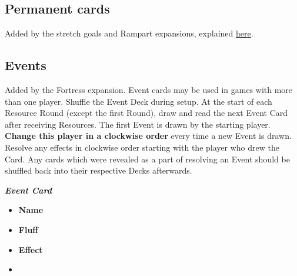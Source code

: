 \begin{multicols*}{2}
\subsection*{Permanent cards}
Added by the stretch goals and Rampart expansions, explained \hyperlink{Playerdecks}{here}.

\subsection*{Events}
Added by the Fortress expansion.
Event cards may be used in games with more than one player.
Shuffle the Event Deck during setup.
At the start of each Resource Round (except the first Round), draw and read the next Event Card after receiving Resources.
The first Event is drawn by the starting player.
\textbf{Change this player in a clockwise order} every time a new Event is drawn.
Resolve any effects in clockwise order starting with the player who drew the Card.
Any cards which were revealed as a part of resolving an Event should be shuffled back into their respective Decks afterwards.

\medskip

\begin{minipage}[h]{\linewidth}
  \vspace{0pt}
  \centering
  \begin{scriptsize}
  \end{scriptsize}
  \footnotesize{\textbf{\textit{\textcolor{darkcandyapplered}{Event Card}}}}
  \scriptsize
  \begin{multicols}{2}
    \begin{itemize}
      \item[\textbf{1.}] \textbf{Name}
      \item[\textbf{2.}] \textbf{Fluff}
      \item[\textbf{3.}] \textbf{Effect}
      \item[\textbf{\phantom{.}}] \phantom{.}
    \end{itemize}
  \end{multicols}
\end{minipage}


\end{multicols*}
